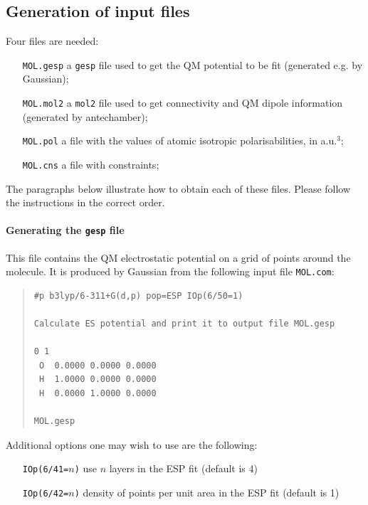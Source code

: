 \documentclass[a4paper]{report}
\begin{document}
\subsection*{Generation of input files}

Four files are needed:
\begin{itemize}
\item[\texttt{MOL.gesp}] a \texttt{gesp} file used to get the QM potential to be fit
(generated e.g. by Gaussian);
\item[\texttt{MOL.mol2}] a \texttt{mol2} file used to get connectivity and QM dipole
information (generated by antechamber);
\item[\texttt{MOL.pol}] a file with the values of atomic isotropic polarisabilities,
in a.u.$^3$;
\item[\texttt{MOL.cns}] a file with constraints;
\end{itemize}

The paragraphs below illustrate how to obtain each of these files. Please follow the instructions in
the correct order.

\paragraph*{Generating the \texttt{gesp} file}

This file contains the QM electrostatic potential on a grid of points around the
molecule. It is produced by Gaussian from the following input file \texttt{MOL.com}:

\begin{framed}
\begin{quote}
\begin{verbatim}
#p b3lyp/6-311+G(d,p) pop=ESP IOp(6/50=1)

Calculate ES potential and print it to output file MOL.gesp

0 1
 O  0.0000 0.0000 0.0000
 H  1.0000 0.0000 0.0000
 H  0.0000 1.0000 0.0000

MOL.gesp
\end{verbatim}
\end{quote}
\end{framed}

Additional options one may wish to use are the following:
\begin{itemize}
\item[\texttt{IOp(6/41=$n$)}] use $n$ layers in the ESP fit (default is 4)
\item[\texttt{IOp(6/42=$n$)}] density of points per unit area in the ESP fit (default
is 1)
\end{itemize}
\end{document}
